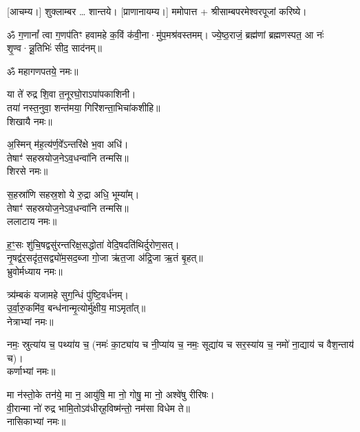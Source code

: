 
\renewcommand{\dot}{·\allowbreak}
\pagecolor{bgcolour}
\color{fgcolour}



[आचम्य।] शुक्लाम्बर … शान्तये। [प्राणानायम्य।] ममोपात्त + श्रीसाम्बपरमेश्वरपूजां करिष्ये।

ॐ ग॒णानां᳚ त्वा ग॒णप॑तिꣳ हवामहे क॒विं क॑वी॒ना\dot{}मु॑प॒मश्र॑वस्तमम्। ज्ये॒ष्ठ॒राजं॒ ब्रह्म॑णां ब्रह्मणस्पत॒ आ नः॑ शृ॒ण्व\dot{}न्नू॒तिभिः॑ सीद॒ साद॑नम्॥

ॐ महागणपतये॒ नमः॥


या ते॑ रुद्र शि॒वा त॒नूरघो॒राऽपा॑पकाशिनी।\\
तया॑ नस्त॒नुवा॒ शन्त॑मया॒ गिरि॑शन्ता॒भिचा॑कशीहि॥\\
शिखायै नमः॥

अ॒स्मिन् म॑ह॒त्य॑र्ण॒वे᳚ऽन्तरि॑क्षे भ॒वा अधि॑।\\
तेषाꣳ॑ सहस्रयोज॒नेऽव॒धन्वा॑नि तन्मसि॥\\
शिरसे नमः॥

स॒हस्रा॑णि सहस्र॒शो ये रु॒द्रा अधि॒ भूम्या᳚म्।\\
तेषाꣳ॑ सहस्रयोज॒नेऽव॒धन्वा॑नि तन्मसि॥\\
ललाटाय नमः॥

ह॒ꣳ॒सः शु॑चि॒षद्वसु॑रन्तरिक्ष॒सद्धोता॑ वेदि॒षदति॑थिर्दुरोण॒सत्।\\
नृ॒षद्व॑र॒सदृ॑त॒सद्व्यो॑म॒सद॒ब्जा गो॒जा ऋ॑त॒जा अ॑द्रि॒जा ऋ॒तं बृ॒हत्॥\\
भ्रुवोर्मध्याय नमः॥

त्र्य॑म्बकं यजामहे सुग॒न्धिं पु॑ष्टि॒वर्ध॑नम्।\\
उ॒र्वा॒रु॒कमि॑व॒ बन्ध॑नान्मृ॒त्योर्मु॑क्षीय॒ माऽमृता᳚त्॥\\
नेत्राभ्यां नमः॥

नमः॒ स्रुत्या॑य च॒ पथ्या॑य च॒ (नमः॑ का॒ट्या॑य च नी॒प्या॑य च॒ %
नमः॒ सूद्या॑य च सर॒स्या॑य च॒ नमो॑ ना॒द्याय॑ च वैश॒न्ताय॑ च)।\\
कर्णाभ्यां नमः॥

मा न॑स्तो॒के तन॑ये॒ मा न॒ आयु॑षि॒ मा नो॒ गोषु॒ मा नो॒ अश्वे॑षु रीरिषः।\\
वी॒रान्मा नो॑ रुद्र भामि॒तोऽव॑धीर्‌ह॒विष्म॑न्तो॒ नम॑सा विधेम ते॥\\
नासिकाभ्यां नमः॥

